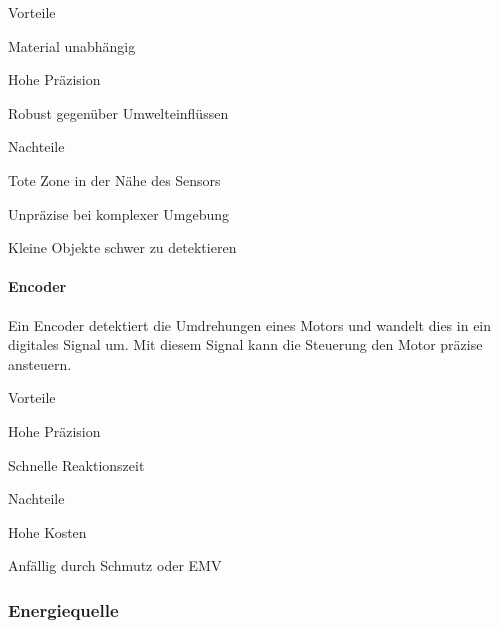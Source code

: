 \begin{minipage}[t]{0.48\textwidth}
\begin{items}
  \item [Vorteile]
  \item Material unabhängig
  \item Hohe Präzision
  \item Robust gegenüber Umwelteinflüssen
\end{items}
\end{minipage}
\hfill
\begin{minipage}[t]{0.48\textwidth}
\begin{items}
  \item [Nachteile]
  \item Tote Zone in der Nähe des Sensors
  \item Unpräzise bei komplexer Umgebung
  \item Kleine Objekte schwer zu detektieren
\end{items}
\end{minipage}

\paragraph{Encoder}
Ein Encoder detektiert die Umdrehungen eines Motors und wandelt dies in ein digitales Signal um. Mit diesem Signal kann die Steuerung den Motor präzise ansteuern.
 

\begin{minipage}[t]{0.48\textwidth}
\begin{items}
  \item [Vorteile]
  \item Hohe Präzision
  \item Schnelle Reaktionszeit
\end{items}
\end{minipage}
\hfill
\begin{minipage}[t]{0.48\textwidth}
\begin{items}
  \item [Nachteile]
  \item Hohe Kosten
  \item Anfällig durch Schmutz oder EMV
\end{items}
\end{minipage}


\subsubsection{Energiequelle}

